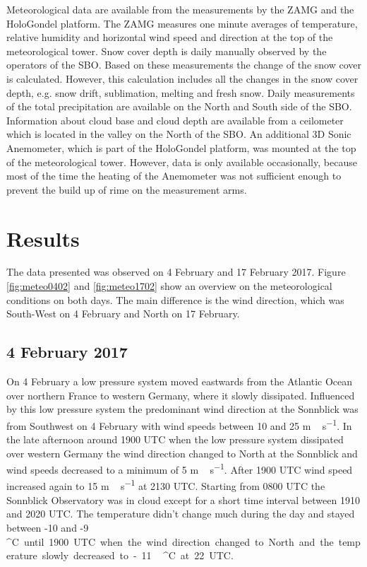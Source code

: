 \documentclass[draft,linenumbers]{agujournal}
\begin{document}

Meteorological data are available from the measurements by the ZAMG and the HoloGondel platform. The ZAMG measures one minute averages of temperature, relative humidity and horizontal wind speed and direction at the top of the meteorological tower. Snow cover depth is daily manually observed by the operators of the SBO. Based on these measurements the change of the snow cover is calculated. However, this calculation includes all the changes in the snow cover depth, e.g. snow drift, sublimation, melting and fresh snow. Daily measurements of the total precipitation are available on the North and South side of the SBO.  Information about cloud base and cloud depth are available from a ceilometer which is located in the valley on the North of the SBO. An additional 3D Sonic Anemometer, which is part of the HoloGondel platform, was mounted at the top of the meteorological tower. However, data is only available occasionally, because most of the time the heating of the Anemometer was not sufficient enough to prevent the build up of rime on the measurement arms. 

\section{Results}
\label{Results}

The data presented was observed on 4 February and 17 February 2017. Figure \ref{fig:meteo0402} and \ref{fig:meteo1702} show an overview on the meteorological conditions on both days. The main difference is the wind direction, which was South-West on 4 February and North on 17 February. 

\subsection{4 February 2017}

On 4 February a low pressure system moved eastwards from the Atlantic Ocean over northern France to western Germany, where it slowly dissipated. Influenced by this low pressure system the predominant wind direction at the Sonnblick was from Southwest on 4 February with wind speeds between 10 and 25 \si{m\,s^{-1}}. In the late afternoon around 1900 UTC when the low pressure system dissipated over western Germany the wind direction changed to North at the Sonnblick and wind speeds decreased to a minimum of 5 \si{m\,s^{-1}}. After 1900 UTC wind speed increased again to 15 \si{m\,s^{-1}} at 2130 UTC. Starting from 0800 UTC the Sonnblick Observatory was in cloud except for a short time interval between 1910 and 2020 UTC. The temperature didn't change much during the day and stayed between -10 and -9\,\si{^\circ C} until 1900 UTC when the wind direction changed to North and the temperature slowly decreased to -11\,\si{^\circ C} at 22 UTC.
\end{document}
